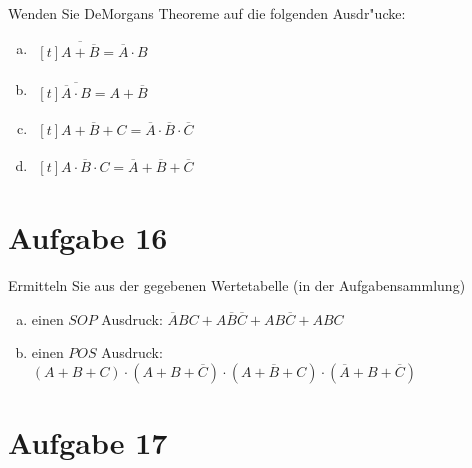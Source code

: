 \documentclass[10pt, oneside]{article}
\begin{document}
Wenden Sie DeMorgans Theoreme auf die folgenden Ausdr"ucke:
\begin{enumerate}[(a)]
    \item $\begin{aligned}[t]
            \overline{A + \overline{B}} = \overline{A} \cdot B
        \end{aligned}$
    \item $\begin{aligned}[t]
            \overline{\overline{A} \cdot B} = A + \overline{B}
        \end{aligned}$
    \item $\begin{aligned}[t]
            \overline{A + B + C} = \overline{A} \cdot \overline{B} \cdot \overline{C}
        \end{aligned}$
    \item $\begin{aligned}[t]
            \overline{A \cdot B \cdot C} = \overline{A} + \overline{B} + \overline{C}
        \end{aligned}$
\end{enumerate}

\section{Aufgabe 16}

Ermitteln Sie aus der gegebenen Wertetabelle (in der Aufgabensammlung)

\begin{enumerate}[(a)]
    \item einen $SOP$ Ausdruck:
        $\overline{A}BC + A\overline{B}\overline{C} + AB\overline{C} + ABC$
    \item einen $POS$ Ausdruck:
        $(A + B + C) \cdot (A + B + \overline{C}) \cdot (A + \overline{B} + C) \cdot (\overline{A} + B + \overline{C})$
\end{enumerate}

\section{Aufgabe 17}
\end{document}
